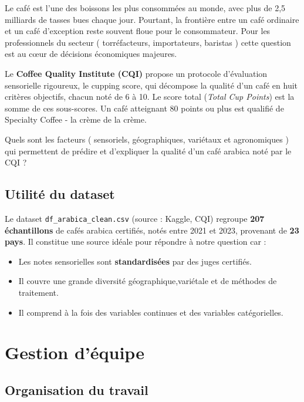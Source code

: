 \documentclass[12pt,a4paper]{article}
\begin{document}
Le café est l'une des boissons les plus consommées au monde, avec plus de 2,5 milliards de tasses
bues chaque jour. Pourtant, la frontière entre un café ordinaire et un café d'exception
reste souvent floue pour le consommateur. Pour les professionnels du secteur ( torréfacteurs,
importateurs, baristas ) cette question est au cœur de décisions économiques majeures.

Le \textbf{Coffee Quality Institute (CQI)} propose un protocole d'évaluation sensorielle
rigoureux, le cupping score, qui décompose la qualité d'un café en huit critères objectifs,
chacun noté de 6 à 10. Le score total (\textit{Total Cup Points}) est la somme de ces sous-scores.
Un café atteignant 80 points ou plus est qualifié de Specialty Coffee - la crème de la crème.


\begin{insight}
  Quels sont les facteurs ( sensoriels, géographiques, variétaux et agronomiques ) qui permettent de prédire et d'expliquer la qualité d'un café arabica noté par le CQI ?
\end{insight}


\subsection{Utilité du dataset}

Le dataset \texttt{df\_arabica\_clean.csv} (source : Kaggle, CQI) regroupe \textbf{207 échantillons}
de cafés arabica certifiés, notés entre 2021 et 2023, provenant de \textbf{23 pays}.
Il constitue une source idéale pour répondre à notre question car :
\begin{itemize}[noitemsep]
  \item Les notes sensorielles sont \textbf{standardisées} par des juges certifiés.
  \item Il couvre une grande diversité géographique,variétale et de méthodes de traitement.
  \item Il comprend à la fois des variables continues et des variables catégorielles.
\end{itemize}


\section{Gestion d'équipe}

\subsection{Organisation du travail}
\end{document}
